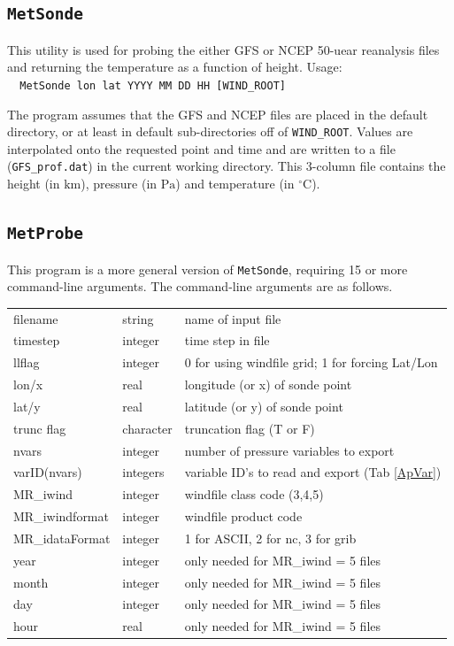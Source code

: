 \documentclass[11pt]{article}   %
\begin{document}
\subsection{\texttt{MetSonde}}
This utility is used for probing the either GFS or NCEP 50-uear reanalysis files and
returning the temperature as a function of height.  
Usage:\\
\verb|  MetSonde lon lat YYYY MM DD HH [WIND_ROOT]|

The program assumes that the GFS and NCEP files are placed in the default directory, or
at least in default sub-directories off of \texttt{WIND\_ROOT}.  Values are interpolated
onto the requested point and time and are written to a file (\texttt{GFS\_prof.dat}) in
the current working directory.  This 3-column file contains the height (in $\mathrm{km}$),
pressure (in $\mathrm{Pa}$) and temperature (in $^{\circ}\mathrm{C}$).

\subsection{\texttt{MetProbe}}
This program is a more general version of \texttt{MetSonde}, requiring 15 or more command-line
arguments.  The command-line arguments are as follows.
\\
\begin{tabular}{ l  l  l }
filename        & string    & name of input file \\
timestep        & integer   & time step in file \\
llflag          & integer   & 0 for using windfile grid; 1 for forcing Lat/Lon \\
lon/x           & real      & longitude (or x) of sonde point \\
lat/y           & real      & latitude (or y) of sonde point \\
trunc flag      & character & truncation flag (T or F) \\
nvars           & integer   & number of pressure variables to export \\
varID(nvars)    & integers  & variable ID's to read and export (Tab \ref{ApVar}) \\
MR\_iwind       & integer   & windfile class code (3,4,5) \\
MR\_iwindformat & integer   & windfile product code \\
MR\_idataFormat & integer   & 1 for ASCII, 2 for nc, 3 for grib \\
year            & integer   & only needed for MR\_iwind = 5 files \\
month           & integer   & only needed for MR\_iwind = 5 files \\
day             & integer   & only needed for MR\_iwind = 5 files \\
hour            & real      & only needed for MR\_iwind = 5 files \\
\end{tabular}
\end{document}
